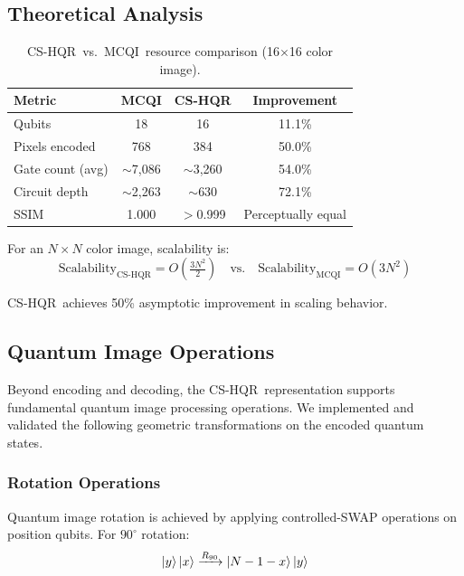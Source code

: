 \documentclass{ipol}
\newcommand{\cshqr}{\textsc{CS-HQR}}
\newcommand{\mcqi}{\textsc{MCQI}}
\begin{document}
\FloatBarrier
\subsection{Theoretical Analysis}

\begin{table}[H]
\begin{center}
\begin{tabular}{lccc}
\hline
Metric & \mcqi & \cshqr & Improvement \\
\hline
Qubits & 18 & 16 & 11.1\% \\
Pixels encoded & 768 & 384 & 50.0\% \\
Gate count (avg) & $\sim$7,086 & $\sim$3,260 & 54.0\% \\
Circuit depth & $\sim$2,263 & $\sim$630 & 72.1\% \\
SSIM & 1.000 & $>$0.999 & Perceptually equal \\
\hline
\end{tabular}
\caption{\cshqr\ vs.\ \mcqi\ resource comparison (16$\times$16 color image).}
\label{tab:cshqr_vs_mcqi}
\end{center}
\end{table}

For an $N \times N$ color image, scalability is:
$$\text{Scalability}_{\text{CS-HQR}} = O\!\left(\tfrac{3N^2}{2}\right)
  \quad\text{vs.}\quad
  \text{Scalability}_{\text{MCQI}} = O(3N^2)$$

\cshqr\ achieves 50\% asymptotic improvement in scaling behavior.

\FloatBarrier
\subsection{Quantum Image Operations}

Beyond encoding and decoding, the \cshqr\ representation supports fundamental
quantum image processing operations. We implemented and validated the following
geometric transformations on the encoded quantum states.

\FloatBarrier
\subsubsection{Rotation Operations}

Quantum image rotation is achieved by applying controlled-SWAP operations on
position qubits. For $90^\circ$ rotation:
\begin{equation}
\ket{y}\ket{x} \xrightarrow{R_{90}} \ket{N-1-x}\ket{y}
\label{eq:rotation}
\end{equation}
\end{document}
